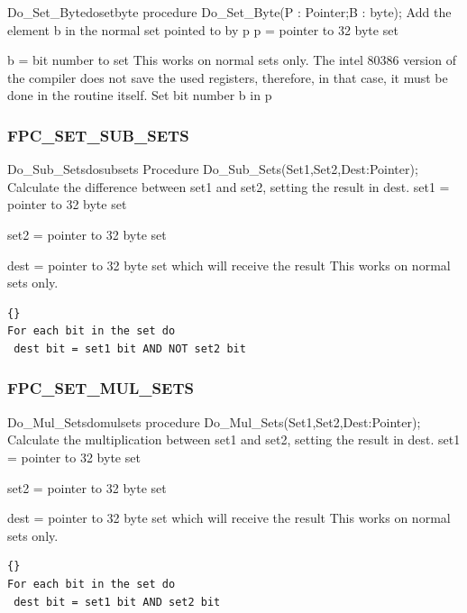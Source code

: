 \documentclass [12pt]{article}
\begin{document}
\begin{procedurel}{Do{\_}Set{\_}Byte}{dosetbyte}
\Declaration
procedure Do{\_}Set{\_}Byte(P : Pointer;B : byte);
\Description 
Add the element \textsf{b} in the normal set pointed to by \textsf{p}
\Parameters 
p = pointer to 32 byte set \par 
b = bit number to set 
\Notes 
This works on normal sets only. The intel 80386 version of the compiler does
not save the used registers, therefore, in that case, it must be done in the
routine itself.
\Algorithm 
Set bit number b in p
\end{procedurel}

\subsubsection{FPC{\_}SET{\_}SUB{\_}SETS}
\label{subsubsec:mylabel91}

\begin{procedurel}{Do{\_}Sub{\_}Sets}{dosubsets}
\Declaration
Procedure Do{\_}Sub{\_}Sets(Set1,Set2,Dest:Pointer);
\Description
Calculate the difference between \textsf{set1} and \textsf{set2}, setting
the result in \textsf{dest}.
\Parameters 
set1 = pointer to 32 byte set \par
set2 = pointer to 32 byte set \par 
dest = pointer to 32 byte set which will receive the result 
\Notes 
This works on normal sets only.  
\Algorithm 
\begin{lstlisting}{}
For each bit in the set do
 dest bit = set1 bit AND NOT set2 bit
\end{lstlisting}
\end{procedurel}

\subsubsection{FPC{\_}SET{\_}MUL{\_}SETS}
\label{subsubsec:mylabel92}

\begin{procedurel}{Do{\_}Mul{\_}Sets}{domulsets}
\Declaration
procedure Do{\_}Mul{\_}Sets(Set1,Set2,Dest:Pointer);
\Description 
Calculate the multiplication between \textsf{set1} and \textsf{set2},
setting the result in \textsf{dest}.
\Parameters 
set1 = pointer to 32 byte set \par
set2 = pointer to 32 byte set \par
dest = pointer to 32 byte set which will receive the result 
\Notes 
This works on normal sets only. 
\Algorithm 
\begin{lstlisting}{}
For each bit in the set do
 dest bit = set1 bit AND set2 bit
\end{lstlisting}
\end{procedurel}
\end{document}
